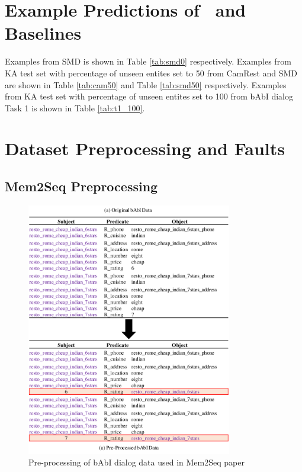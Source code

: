 \section{Example Predictions of \sys\ and Baselines}
\label{sec:examples}
Examples from SMD is shown in Table \ref{tab:smd0} respectively. Examples from KA test set with percentage of unseen entites set to 50 from CamRest and SMD are shown in Table \ref{tab:cam50} and Table \ref{tab:smd50} respectively. Examples from KA test set with percentage of unseen entites set to 100 from bAbI dialog Task 1 is shown in Table \ref{tab:t1_100}.





\section{Dataset Preprocessing and Faults}
\label{sec:preprocess}
\subsection{Mem2Seq Preprocessing}
\label{sec:prep_mem}

\begin{figure}[ht]
\centering
\includegraphics[width=0.8\textwidth]{assets/babi-preprocess.pdf}
\caption{Pre-processing of bAbI dialog data used in Mem2Seq paper}
\label{fig:prebabi}
\end{figure}

